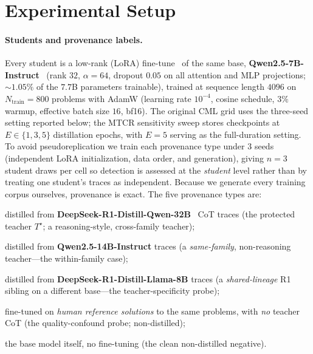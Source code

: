 \section{Experimental Setup}
\label{sec:setup}

\paragraph{Students and provenance labels.}
Every student is a low-rank (LoRA) fine-tune~\citep{hu2022lora} of the same base,
\textbf{Qwen2.5-7B-Instruct}~\citep{qwen2025qwen25}
(rank $32$, $\alpha\!=\!64$, dropout $0.05$ on all attention and MLP projections; $\sim\!1.05\%$ of
the $7.7$B parameters trainable), trained at sequence length $4096$ on
$N_{\mathrm{train}}=800$ problems with AdamW (learning rate $10^{-4}$, cosine schedule, $3\%$ warmup,
effective batch size $16$, bf16). The original CML grid uses the three-seed setting
reported below; the MTCR sensitivity sweep stores checkpoints at $E\in\{1,3,5\}$
distillation epochs, with $E=5$ serving as the full-duration setting. To avoid pseudoreplication we train each provenance type under
$3$ seeds (independent LoRA initialization, data order, and generation), giving $n\!=\!3$ student
draws per cell so detection is assessed at the \emph{student} level rather than by treating one
student's traces as independent. Because we generate every training corpus ourselves, provenance is
exact. The five provenance types are:
\begin{description}[leftmargin=1.4em,itemsep=1pt]
  \item[\texttt{suspect}] distilled from \textbf{DeepSeek-R1-Distill-Qwen-32B}~\citep{deepseekai2025r1} CoT traces (the
        protected teacher $T^\star$; a reasoning-style, cross-family teacher);
  \item[\texttt{ctrlInst}] distilled from \textbf{Qwen2.5-14B-Instruct} traces (a
        \emph{same-family}, non-reasoning teacher---the within-family case);
  \item[\texttt{ctrlLlama}] distilled from \textbf{DeepSeek-R1-Distill-Llama-8B} traces (a
        \emph{shared-lineage} R1 sibling on a different base---the teacher-specificity probe);
  \item[\texttt{ctrlC}] fine-tuned on \emph{human reference solutions} to the same problems, with
        \emph{no} teacher CoT (the quality-confound probe; non-distilled);
  \item[\texttt{ctrlA}] the base model itself, no fine-tuning (the clean non-distilled negative).
\end{description}

